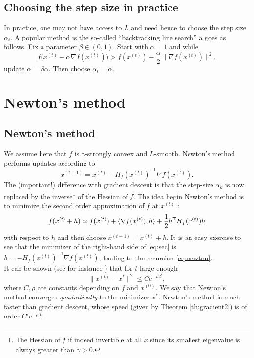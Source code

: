 \documentclass[11pt,nocut]{article}
\begin{document}
\subsection{Choosing the step size in practice}

In practice, one may not have access to $L$ and need hence to choose the step size $\alpha_t$. A popular method is the so-called ``backtracking line search'' a goes as follows.
Fix a parameter $\beta \in (0,1)$.
Start with $\alpha = 1$ and while
$$
f\big(x^{(t)} - \alpha \nabla f (x^{(t)}) \big) > f(x^{(t)}) - \frac{\alpha}{2} \|\nabla f(x^{(t)}) \|^2,
$$
update $\alpha =\beta \alpha$. Then choose $\alpha_t = \alpha$.

\section{Newton's method}

\subsection{Newton's method}
We assume here that $f$ is $\gamma$-strongly convex and $L$-smooth.
Newton's method performs updates according to
\begin{equation}\label{eq:newton}
	x^{(t+1)} = x^{(t)} - H_f(x^{(t)})^{-1} \nabla f(x^{(t)}).
\end{equation}
The (important!) difference with gradient descent is that the step-size $\alpha_k$ is now replaced by the inverse\footnote{The Hessian of $f$ if indeed invertible at all $x$ since its smallest eigenvalue is always greater than $\gamma >0$.} of the Hessian of $f$. The idea begin Newton's method is to minimize the second order approximation of $f$ at $x^{(t)}$ :
\begin{equation}\label{eq:sec}
	f(x^{(t)}+h) \simeq f(x^{(t)}) + \langle \nabla f(x^{(t)}), h \rangle + \frac{1}{2} h^{{\sf T}} H_f(x^{(t)}) h
\end{equation}
with respect to $h$ and then choose $x^{(t+1)} = x^{(t)} + h$. It is an easy exercise to see that the minimizer of the right-hand side of \eqref{eq:sec} is $h=- H_f(x^{(t)})^{-1} \nabla f(x^{(t)})$, leading to the recursion \eqref{eq:newton}.
\\

It can be shown (see for instance \cite{boyd2004convex}) that for $t$ large enough
\begin{equation}\label{eq:newton}
\|x^{(t)} - x^* \|^2 \leq C e^{-\rho 2^t},
\end{equation}
where $C,\rho$ are constants depending on $f$ and $x^{(0)}$. We say that Newton's method converges \emph{quadratically} to the minimizer $x^*$. Newton's method is much faster than gradient descent, whose speed (given by Theorem \ref{th:gradient2}) is of order $C' e^{-\rho' t}$.
\end{document}
